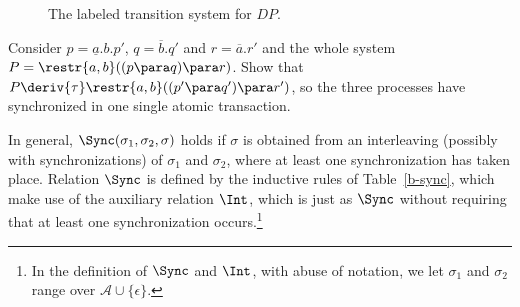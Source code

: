       \begin{figure}[t]
	\centering
	\caption{The labeled transition system for $DP$.}
	\label{ltsdining}
      \end{figure}

      \begin{exercise}\label{multi-sync-exer}
	Consider $p = \underline{a}.b.p'$, $q = \overline{b}.q'$ and $r = \overline{a}.r'$ and the whole system $P = \restr{a,b}((p \para q) \para r)$. Show that $P \deriv{\tau} \restr{a,b}((p' \para q') \para r')$, so the three processes have synchronized in one single atomic transaction.
      \fine
      \end{exercise}


      In general, $\Sync(\sigma_1, \sigma_2, \sigma)$ holds if $\sigma$ is obtained from an interleaving (possibly with synchronizations) of $\sigma_1$ and $\sigma_2$, where at least one synchronization has taken place. Relation $\Sync$ is defined by the inductive rules of Table~\ref{b-sync}, which make use of the auxiliary relation $\Int$, which is just as $\Sync$ without requiring that at least one synchronization occurs.\footnote{In the definition of $\Sync$ and $\Int$, with abuse of notation, we let $\sigma_1$ and $\sigma_2$ range over $\mathcal{A} \cup \{\epsilon\}$.}

